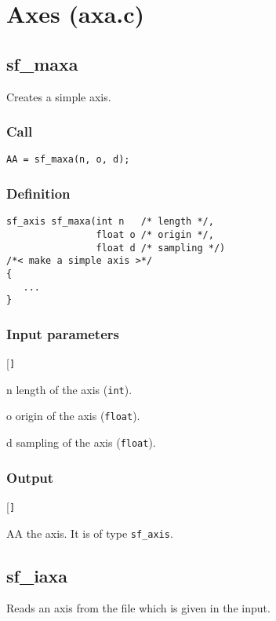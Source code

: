\section{Axes (axa.c)}\label{sec:axa.c}




\subsection{{sf\_maxa}}
Creates a simple axis.

\subsubsection*{Call}
\begin{verbatim}AA = sf_maxa(n, o, d);\end{verbatim}

\subsubsection*{Definition}
\begin{verbatim}
sf_axis sf_maxa(int n   /* length */, 
                float o /* origin */, 
                float d /* sampling */)
/*< make a simple axis >*/
{
   ...
}
\end{verbatim}

\subsubsection{Input parameters}
\begin{desclist}{\tt }{\quad}[\tt ]
   \setlength\itemsep{0pt}
   \item[n] length of the axis (\texttt{int}).  
   \item[o] origin of the axis (\texttt{float}).  
   \item[d] sampling of the axis (\texttt{float}).  
\end{desclist}

\subsubsection*{Output}
\begin{desclist}{\tt }{\quad}[\tt ]
   \setlength\itemsep{0pt}  
   \item[AA] the axis. It is of type \texttt{sf\_axis}.
\end{desclist}




\subsection{{sf\_iaxa}}\label{sec:sf_iaxa}
Reads an axis from the file which is given in the input.


